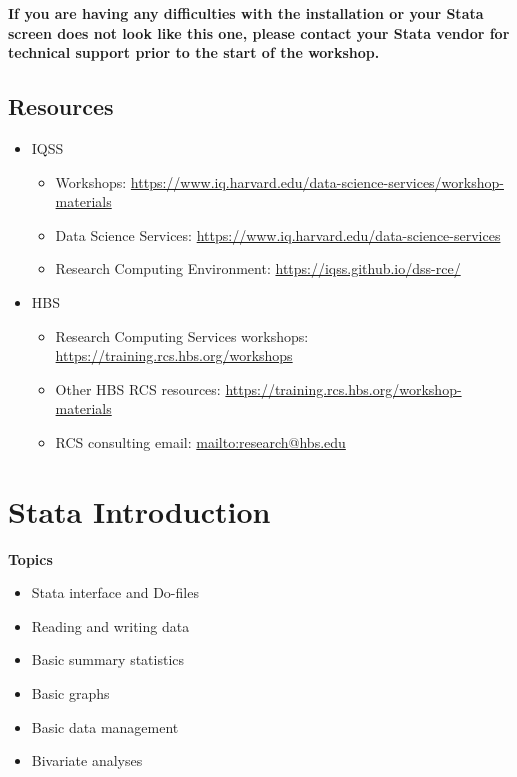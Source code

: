 \documentclass[
]{book}
\providecommand{\tightlist}{%
  \setlength{\itemsep}{0pt}\setlength{\parskip}{0pt}}
\begin{document}
\textbf{If you are having any difficulties with the installation or your Stata screen does not look like this one, please contact your Stata vendor for technical support prior to the start of the workshop.}

\hypertarget{resources-9}{%
\section{Resources}\label{resources-9}}

\begin{itemize}
\tightlist
\item
  IQSS

  \begin{itemize}
  \tightlist
  \item
    Workshops: \url{https://www.iq.harvard.edu/data-science-services/workshop-materials}
  \item
    Data Science Services: \url{https://www.iq.harvard.edu/data-science-services}
  \item
    Research Computing Environment: \url{https://iqss.github.io/dss-rce/}
  \end{itemize}
\item
  HBS

  \begin{itemize}
  \tightlist
  \item
    Research Computing Services workshops: \url{https://training.rcs.hbs.org/workshops}
  \item
    Other HBS RCS resources: \url{https://training.rcs.hbs.org/workshop-materials}
  \item
    RCS consulting email: \url{mailto:research@hbs.edu}
  \end{itemize}
\end{itemize}

\hypertarget{stata-introduction}{%
\chapter{Stata Introduction}\label{stata-introduction}}

\textbf{Topics}

\begin{itemize}
\tightlist
\item
  Stata interface and Do-files
\item
  Reading and writing data
\item
  Basic summary statistics
\item
  Basic graphs
\item
  Basic data management
\item
  Bivariate analyses
\end{itemize}
\end{document}
